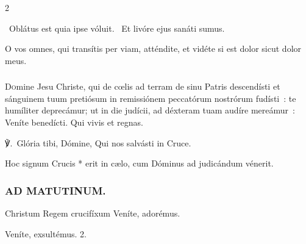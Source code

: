 \documentclass[9pt,twoside]{extarticle}
\begin{document}
\begin{multicols}{2}
{\begin{tightlist}{}
\item {}~Oblátus est quia ipse vóluit. ~Et livóre ejus sanáti sumus.
\item {} O vos omnes, qui transítis per viam, atténdite, et vidéte si est dolor sicut dolor meus.
\end{tightlist}

\subsubsection*{\center {}}
\lettrine{D}omine Jesu Christe, qui de cœlis ad terram de sinu Patris descendísti et sánguinem tuum pretiósum in remissiónem peccatórum nostrórum fudísti~: te humíliter deprecámur; ut in die judícii, ad déxteram tuam audíre mereámur~: Veníte benedícti. Qui vivis et regnas.

\begin{tightlist}{}
\item {} ℣.~Glória tibi, Dómine, Qui nos salvásti in Cruce.
\item {}
\item {} Hoc signum Crucis * erit in cælo, cum Dóminus ad judicándum vénerit.
\end{tightlist}

\subsubsection*{\center \textsc{AD MATUTINUM.}}
\begin{tightlist}{}
\item {} Christum Regem crucifíxum \textred{*} Veníte, adorémus.
\item {} Veníte, exsultémus. 2. 
\end{tightlist}
}
\end{multicols}
\end{document}
